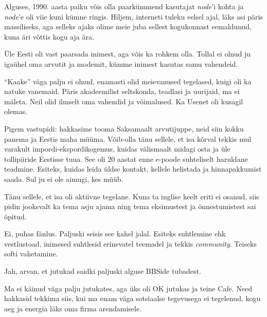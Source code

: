 Alguses, 1990. aasta paiku võis olla paarkümmend 
kasutajat \emph{node}'i kohta ja \emph{node}'e oli viie kuni kümne 
ringis. Hiljem, interneti tuleku eelsel ajal, läks asi päris 
massiliseks, aga selleks ajaks olime meie juba sellest kogukonnast eemaldunud, kuna äri võttis kogu aja ära. 

Üle Eesti oli vast paarsada inimest, aga võis ka rohkem olla. Tollal ei olnud ju igaühel oma arvutit ja modemit, kümme inimest kasutas samu vahendeid. 


\enquote{Kaake} väga palju ei olnud, enamasti olid meievanused tegelased, kuigi oli ka natuke vanemaid. 
Päris akadeemilist seltskonda, 
teadlasi ja uurijaid, ma ei mäleta. Neil olid ilmselt oma vahendid ja 
võimalused. Ka Usenet oli kusagil olemas.


Pigem vastupidi: hakkasime tooma Saksamaalt arvutijuppe, neid siin kokku 
panema ja Eestis maha müüma. Võib-olla tänu sellele, et isa kõrval 
tekkis mul varakult impordi-ekspordikogemus, kuidas välismaalt midagi osta ja üle tollipiiride Eestisse tuua. See oli 20 aastat enne e-poode suhteliselt 
haruldane teadmine. Esiteks, kuidas leida üldse kontakt, kellele helistada ja 
hinnapakkumist saada. Sul ju ei ole aimugi, kes müüb.


Tänu sellele, et isa oli aktiivne tegelane. Kuna ta inglise keelt 
eriti ei osanud, siis pidin jooksvalt ka tema asju ajama ning tema 
eksimustest ja õnnestumistest sai õpitud. 


Ei, puhas fänlus. Paljuski seisis see kahel jalal. Esiteks suhtlemine 
ehk vestlustoad, inimesed suhtlesid erinevatel teemadel ja tekkis 
\emph{community}. Teiseks softi vahetamine.


Jah, arvan, et jutukad saidki paljuski alguse BBSide 
tubadest.


Ma ei käinud väga palju jutukates, aga üks oli OK jutukas
ja teine Cafe. Need hakkasid tekkima siis, kui 
ma enam väga sotsiaalse tegevusega ei tegelenud, kogu aeg ja energia 
läks oma firma arendamisele.

